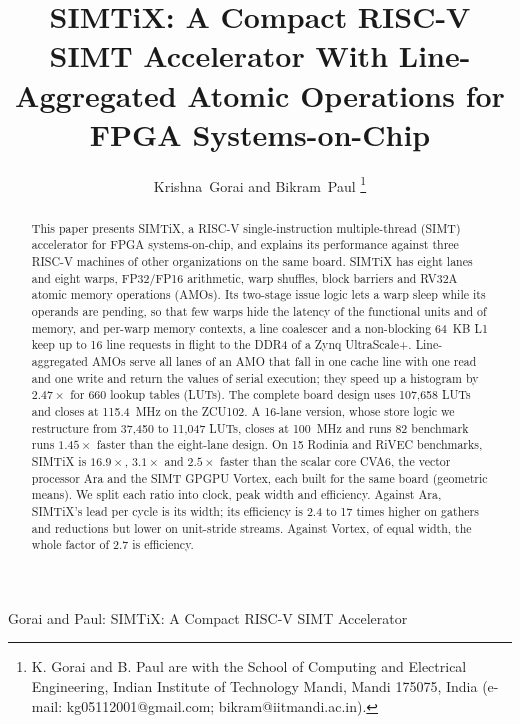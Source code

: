 \documentclass[journal]{IEEEtran}
\begin{document}
\title{SIMTiX: A Compact RISC-V SIMT Accelerator With Line-Aggregated Atomic
Operations for FPGA Systems-on-Chip}

\author{Krishna~Gorai and Bikram~Paul%
\thanks{K. Gorai and B. Paul are with the School of Computing and Electrical
Engineering, Indian Institute of Technology Mandi, Mandi 175075, India (e-mail:
kg05112001@gmail.com; bikram@iitmandi.ac.in).}}

%
{Gorai and Paul: SIMTiX: A Compact RISC-V SIMT Accelerator}

\maketitle

\begin{abstract}
This paper presents SIMTiX, a RISC-V single-instruction multiple-thread (SIMT)
accelerator for FPGA systems-on-chip, and explains its performance against three
RISC-V machines of other organizations on the same board. SIMTiX has eight lanes and
eight warps, FP32/FP16 arithmetic, warp shuffles, block barriers and RV32A atomic
memory operations (AMOs). Its two-stage issue logic lets a warp sleep while its
operands are pending, so that few warps hide the latency of the functional units and
of memory, and per-warp memory contexts, a line coalescer and a non-blocking 64~KB L1
keep up to 16 line requests in flight to the DDR4 of a Zynq UltraScale+.
Line-aggregated AMOs serve all lanes of an AMO that fall in one cache line with one
read and one write and return the values of serial execution; they speed up a
histogram by $2.47\times$ for 660 lookup tables (LUTs). The complete board design uses
107,658 LUTs and closes at 115.4~MHz on the ZCU102. A 16-lane version, whose store
logic we restructure from 37,450 to 11,047 LUTs, closes at 100~MHz and runs 82
benchmark runs $1.45\times$ faster than the eight-lane design. On 15 Rodinia and RiVEC
benchmarks, SIMTiX is $16.9\times$, $3.1\times$ and $2.5\times$ faster than the scalar
core CVA6, the vector processor Ara and the SIMT GPGPU Vortex, each built for the same
board (geometric means). We split each ratio into clock, peak width and efficiency.
Against Ara, SIMTiX's lead per cycle is its width; its efficiency is 2.4 to 17 times
higher on gathers and reductions but lower on unit-stride streams. Against Vortex, of
equal width, the whole factor of 2.7 is efficiency.
\end{abstract}
\end{document}
